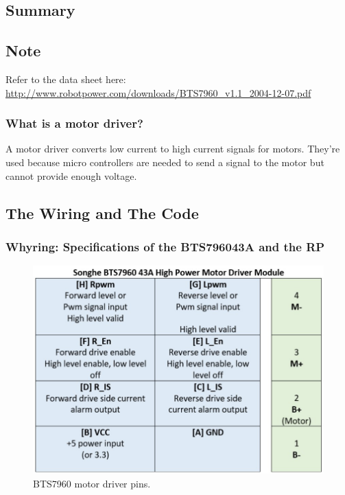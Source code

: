 \documentclass[a4paper, 10pt]{article}
\begin{document}
    \subsection*{Summary}

    \subsection*{Note}
    Refer to the data sheet here: \\ \url{http://www.robotpower.com/downloads/BTS7960_v1.1_2004-12-07.pdf}

    \subsubsection{What is a motor driver?}
        A motor driver converts low current to high current signals for motors. They're used because micro controllers are needed to send a signal to the motor  but cannot provide enough voltage. 

    \subsection{The Wiring and The Code}
    \subsubsection{Whyring: Specifications of the BTS796043A and the RP}

    \begin{figure}[!htb]
    \centering
    \includegraphics[width=\linewidth]{media/bts7960_pins.jpg}
    \caption{BTS7960 motor driver pins.}
    \label{fig:bts7960_pins}
    \end{figure}
    \newline
    
\end{document}
